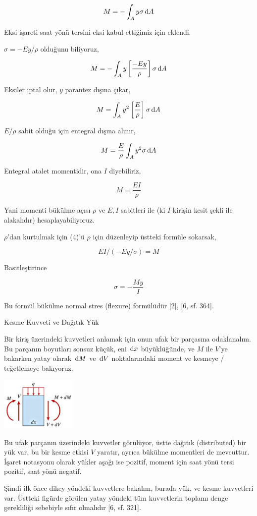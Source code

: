 \documentclass[12pt,fleqn]{article}\usepackage{../../common}
\begin{document}
$$
M = - \int_A y \sigma \,\mathrm{d} A
$$

Eksi işareti saat yönü tersini eksi kabul ettiğimiz için eklendi.

$\sigma = -Ey/\rho$ olduğunu biliyoruz,

$$
M = - \int_A y \left[ \frac{-Ey}{\rho} \right] \sigma \,\mathrm{d} A
$$

Eksiler iptal olur, $y$ parantez dışına çıkar,

$$
M = \int_A y^2 \left[ \frac{E}{\rho} \right] \sigma \,\mathrm{d} A
$$

$E/\rho$ sabit olduğu için entegral dışına alınır,

$$
M = \frac{E}{\rho} \int_A y^2 \sigma \,\mathrm{d} A
$$

Entegral atalet momentidir, ona $I$ diyebiliriz, 

$$
M = \frac{EI}{\rho}
$$

Yani momenti bükülme açısı $\rho$ ve $E,I$ sabitleri ile (ki $I$ kirişin kesit
şekli ile alakalıdır) hesaplayabiliyoruz.

$\rho$'dan kurtulmak için (4)'ü $\rho$ için düzenleyip üstteki formüle sokarsak,

$$
EI / (-Ey / \sigma )  = M
$$

Basitleştirince

$$
\sigma = - \frac{M y}{I}
$$

Bu formül bükülme normal stres (flexure) formülüdür [2], [6, sf. 364].

Kesme Kuvveti ve Dağıtık Yük

Bir kiriş üzerindeki kuvvetleri anlamak için onun ufak bir parçasına
odaklanalım. Bu parçanın boyutları sonsuz küçük, eni $\,\mathrm{d} x$ büyüklüğünde, ve
$M$ ile $V$'ye bakarken yatay olarak $\,\mathrm{d} M$ ve $\,\mathrm{d} V$ noktalarındaki moment ve
kesmeye / teğetlemeye bakıyoruz.

\includegraphics[width=10em]{phy_020_strs_02_10.jpg}

Bu ufak parçanın üzerindeki kuvvetler görülüyor, üstte dağıtık (distributed) bir
yük var, bu bir kesme etkisi $V$ yaratır, ayrıca bükülme momentleri de
mevcuttur. İşaret notasyonu olarak yükler aşağı ise pozitif, moment için
saat yönü tersi pozitif, saat yönü negatif.

Şimdi ilk önce dikey yöndeki kuvvetlere bakalım, burada yük, ve kesme
kuvvetleri var. Üstteki figürde görülen yatay yöndeki tüm kuvvetlerin toplamı
denge gerekliliği sebebiyle sıfır olmalıdır [6, sf. 321].
\end{document}
